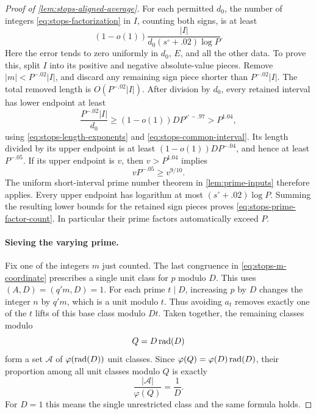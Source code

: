 \begin{proof}[Proof of \cref{lem:stops-aligned-average}]
For each permitted $d_0$, the number of integers
\eqref{eq:stops-factorization} in $I$, counting both signs, is at least
\begin{equation}\label{eq:stops-prime-factor-count}
 (1-o(1))\frac{|I|}{d_0(s^\circ+.02)\log P}.
\end{equation}
Here the error tends to zero uniformly in $d_0$, $E$, and all the
other data.  To prove this, split $I$ into its positive and negative
absolute-value pieces.  Remove $|m|<P^{-.02}|I|$, and discard any
remaining sign piece shorter than $P^{-.02}|I|$.  The total removed
length is $O(P^{-.02}|I|)$.  After division by $d_0$, every retained
interval has lower endpoint at least
\[
 \frac{P^{-.02}|I|}{d_0}
 \ge(1-o(1))D P^{s^\circ-.97}>P^{1.04},
\]
using \eqref{eq:stops-length-exponents} and
\eqref{eq:stops-common-interval}.  Its length divided by its upper
endpoint is at least $(1-o(1))DP^{-.04}$, and hence at least
$P^{-.05}$.  If its upper endpoint is $v$, then $v>P^{1.04}$ implies
\[
 vP^{-.05}\ge v^{9/10}.
\]
The uniform short-interval prime number theorem in
\cref{lem:prime-inputs} therefore applies.  Every upper endpoint has
logarithm at most $(s^\circ+.02)\log P$.  Summing the resulting
lower bounds for the retained sign pieces proves
\eqref{eq:stops-prime-factor-count}.  In particular their prime factors
automatically exceed $P$.

\paragraph{Sieving the varying prime.}

Fix one of the integers $m$ just counted.  The last congruence in
\eqref{eq:stops-m-coordinate} prescribes a single unit class for $p$
modulo $D$.  This uses $(A,D)=(q'm,D)=1$.  For each prime $t\mid D$,
increasing $p$ by $D$ changes the integer $n$ by $q'm$, which is a
unit modulo $t$.  Thus avoiding $a_t$ removes exactly one of the $t$
lifts of this base class modulo $Dt$.  Taken together, the remaining
classes modulo
\[
 Q=D\operatorname{rad}(D)
\]
form a set $\mathcal A$ of
$\varphi(\operatorname{rad}(D))$ unit classes.  Since
$\varphi(Q)=\varphi(D)\operatorname{rad}(D)$, their proportion among all unit
classes modulo $Q$ is exactly
\begin{equation}\label{eq:stops-lift-fraction}
 \frac{|\mathcal A|}{\varphi(Q)}=\frac1D.
\end{equation}
For $D=1$ this means the single unrestricted class and the same formula
holds.


\end{proof}

